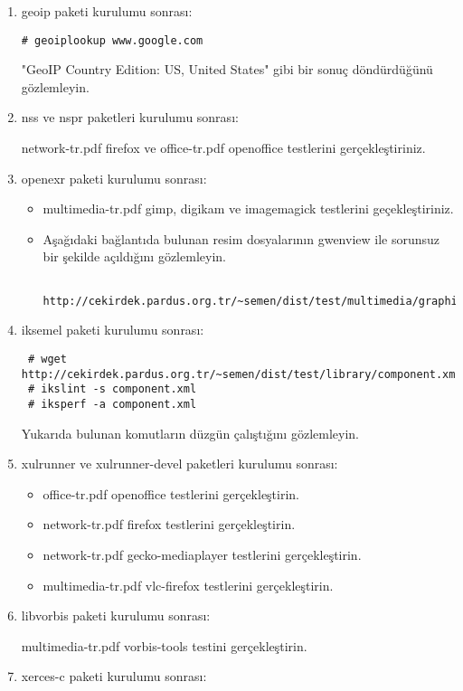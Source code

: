 \documentclass[a4paper,10pt]{article}
\begin{document}
\begin{enumerate}
\item geoip paketi kurulumu sonrası:
\begin{verbatim}
# geoiplookup www.google.com 
\end{verbatim}
"GeoIP Country Edition: US, United States" gibi bir sonuç döndürdüğünü gözlemleyin.

\item nss ve nspr paketleri kurulumu sonrası:

network-tr.pdf firefox ve office-tr.pdf openoffice testlerini gerçekleştiriniz.

\item openexr paketi kurulumu sonrası:
\begin{itemize}
 \item multimedia-tr.pdf gimp, digikam ve imagemagick testlerini geçekleştiriniz.
 \item Aşağıdaki bağlantıda bulunan resim dosyalarının gwenview ile sorunsuz bir şekilde açıldığını gözlemleyin.
  \begin{verbatim}
   http://cekirdek.pardus.org.tr/~semen/dist/test/multimedia/graphics/graphics.tar
  \end{verbatim}
\end{itemize}
\item iksemel paketi kurulumu sonrası:
\begin{verbatim}
 # wget http://cekirdek.pardus.org.tr/~semen/dist/test/library/component.xml
 # ikslint -s component.xml
 # iksperf -a component.xml 
\end{verbatim}


Yukarıda bulunan komutların düzgün çalıştığını gözlemleyin.

\item xulrunner ve xulrunner-devel paketleri kurulumu sonrası:
\begin{itemize}
\item office-tr.pdf openoffice testlerini gerçekleştirin.
\item network-tr.pdf firefox testlerini gerçekleştirin.
\item network-tr.pdf gecko-mediaplayer testlerini gerçekleştirin.
\item multimedia-tr.pdf vlc-firefox testlerini gerçekleştirin.
\end{itemize}

\item libvorbis paketi kurulumu sonrası:

multimedia-tr.pdf vorbis-tools testini gerçekleştirin.

\item xerces-c paketi kurulumu sonrası:


\end{enumerate}
\end{document}
